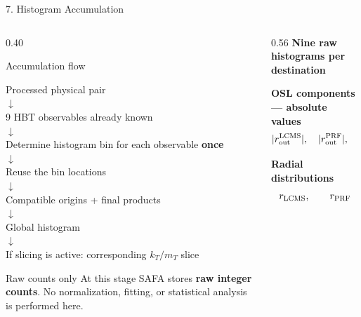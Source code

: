 \documentclass{beamer}
\begin{document}
\begin{frame}{7. Histogram Accumulation}
\fontsize{6.7}{7.5}\selectfont

\begin{columns}[T]

\begin{column}{0.40\textwidth}
\begin{block}{Accumulation flow}
\begin{center}
Processed physical pair\\[-0.15em]
$\downarrow$\\[-0.15em]
9 HBT observables already known\\[-0.15em]
$\downarrow$\\[-0.15em]
Determine histogram bin for each observable \textbf{once}\\[-0.15em]
$\downarrow$\\[-0.15em]
Reuse the bin locations\\[-0.15em]
$\downarrow$\\[-0.15em]
Compatible origins + final products\\[-0.15em]
$\downarrow$\\[-0.15em]
Global histogram\\[-0.15em]
$\downarrow$\\[-0.15em]
If slicing is active: corresponding $k_T/m_T$ slice
\end{center}
\end{block}

\vspace{-0.25em}
\begin{alertblock}{Raw counts only}
At this stage SAFA stores \textbf{raw integer counts}. No normalization, fitting, or statistical analysis is performed here.
\end{alertblock}
\end{column}

\begin{column}{0.56\textwidth}
\textbf{Nine raw histograms per destination}

\smallskip
\textbf{OSL components --- absolute values}
\vspace{-0.3em}
\[
|r_{\rm out}^{\rm LCMS}|,\quad
|r_{\rm out}^{\rm PRF}|,\quad
|r_{\rm side}|,\quad
|r_{\rm long}|
\]
\vspace{-0.55em}

\textbf{Radial distributions}
\vspace{-0.3em}
\[
r_{\rm LCMS},\qquad r_{\rm PRF}
\]
\vspace{-0.55em}


\end{column}
\end{columns}
\end{frame}
\end{document}
